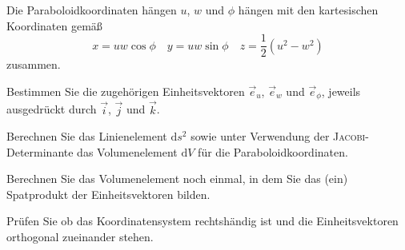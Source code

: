 \begin{atiTask}[
  title = Paraboloidkoordinaten
]

Die Paraboloidkoordinaten hängen $u$, $w$ und $\phi$ hängen mit den kartesischen Koordinaten gemäß
\[
x=uw\cos \phi\quad y=uw\sin \phi\quad z=\frac{1}{2}(u^2-w^2)
\]
zusammen.
\begin{atiSubtasks}
	\item Bestimmen Sie die zugehörigen Einheitsvektoren $\vec{e}_u$, $\vec{e}_w$ und $\vec{e}_\phi$, jeweils ausgedrückt durch $\vec{i}$, $\vec{j}$ und $\vec{k}$.
	\item Berechnen Sie das Linienelement $\mathrm{d} s^2$ sowie unter Verwendung der \textsc{Jacobi}-Determinante das Volumenelement $\mathrm{d} V$ für die Paraboloidkoordinaten.
	\item Berechnen Sie das Volumenelement noch einmal, in dem Sie das (ein) Spatprodukt der Einheitsvektoren bilden.
	\item Prüfen Sie ob das Koordinatensystem rechtshändig ist und die Einheitsvektoren orthogonal zueinander stehen.
\end{atiSubtasks}


\end{atiTask}

\begin{atiSolution}
	
\end{atiSolution}